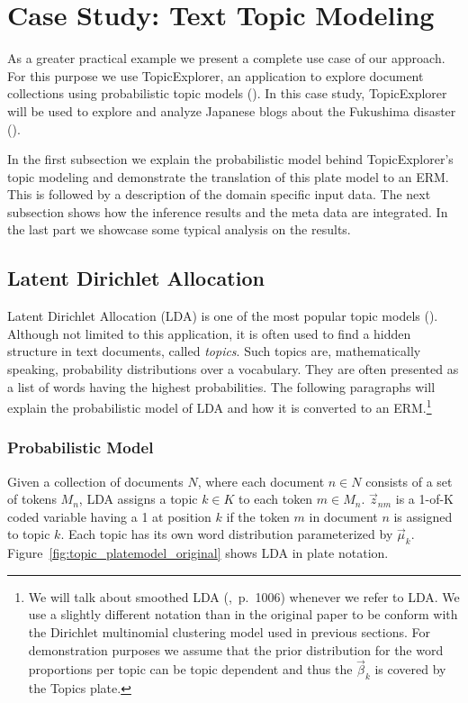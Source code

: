 \section{Case Study: Text Topic Modeling}\label{sec:casestudy}

As a greater practical example we present a complete use case of our approach. For this purpose we use TopicExplorer, an application to explore document collections using probabilistic topic models (\cite{hinneburg2012topicexplorer}). In this case study, TopicExplorer will be used to explore and analyze Japanese blogs about the Fukushima disaster (\cite{ines2011fukushima}).

In the first subsection we explain the probabilistic model behind TopicExplorer's topic modeling and demonstrate the translation of this plate model to an ERM. This is followed by a description of the domain specific input data. The next subsection shows how the inference results and the meta data are integrated. In the last part we showcase some typical analysis on the results.

\subsection{Latent Dirichlet Allocation}

Latent Dirichlet Allocation (LDA) is one of the most popular topic models (\cite{blei2003latent}). Although not limited to this application, it is often used to find a hidden structure in text documents, called \emph{topics}. Such topics are, mathematically speaking, probability distributions over a vocabulary. They are often presented as a list of words having the highest probabilities. The following paragraphs will explain the probabilistic model of LDA and how it is converted to an ERM.\footnote{We will talk about smoothed LDA (\cite{blei2003latent},~p.~1006) whenever we refer to LDA. We use a slightly different notation than in the original paper to be conform with the Dirichlet multinomial clustering model used in previous sections. For demonstration purposes we assume that the prior distribution for the word proportions per topic can be topic dependent and thus the $\vec \beta_k$ is covered by the Topics plate.}

\subsubsection{Probabilistic Model}

Given a collection of documents $N$, where each document $n \in N$ consists of a set of tokens $M_n$, LDA assigns a topic $k \in K$ to each token $m \in M_n$. $\vec z_{nm}$ is a 1-of-K coded variable having a 1 at position $k$ if the token $m$ in document $n$ is assigned to topic $k$. Each topic has its own word distribution parameterized by $\vec \mu_k$. Figure~\ref{fig:topic_platemodel_original} shows LDA in plate notation.

